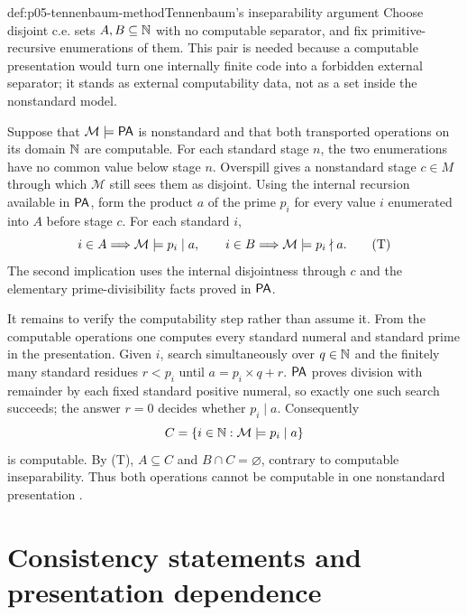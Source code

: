 \begin{hbmethod}{def:p05-tennenbaum-method}{Tennenbaum's inseparability argument}
Choose disjoint c.e. sets \(A,B\subseteq\mathbb{N}\) with no computable separator, and
fix primitive-recursive enumerations of them.  This pair is needed because a
computable presentation would turn one internally finite code into a forbidden
external separator; it stands as external computability data, not as a set
inside the nonstandard model.

Suppose that \(\mathcal M\models\mathsf{PA}\) is nonstandard and that both transported
operations on its domain \(\mathbb{N}\) are computable.  For each standard stage \(n\),
the two enumerations have no common value below stage \(n\).  Overspill gives a
nonstandard stage \(c\in M\) through which \(\mathcal M\) still sees them as
disjoint.  Using the internal recursion available in \(\mathsf{PA}\), form the product
\(a\) of the prime \(p_i\) for every value \(i\) enumerated into \(A\) before
stage \(c\).  For each standard \(i\),
\[
 i\in A\Longrightarrow \mathcal M\models p_i\mid a,
 \qquad
 i\in B\Longrightarrow \mathcal M\models p_i\nmid a.                 \tag{T}
\]
The second implication uses the internal disjointness through \(c\) and the
elementary prime-divisibility facts proved in \(\mathsf{PA}\).

It remains to verify the computability step rather than assume it.  From the
computable operations one computes every standard numeral and standard prime
in the presentation.  Given \(i\), search simultaneously over \(q\in\mathbb{N}\) and
the finitely many standard residues \(r<p_i\) until
\(a=p_i\times q+r\).  \(\mathsf{PA}\) proves division with remainder by each fixed
standard positive numeral, so exactly one such search succeeds; the answer
\(r=0\) decides whether \(p_i\mid a\).  Consequently
\[
 C=\{i\in\mathbb{N}:\mathcal M\models p_i\mid a\}
\]
is computable.  By (T), \(A\subseteq C\) and \(B\cap C=\varnothing\), contrary
to computable inseparability.  Thus both operations cannot be computable in
one nonstandard presentation \cite{Tennenbaum1959,Kaye1991}.
\end{hbmethod}

\section{Consistency statements and presentation dependence}

